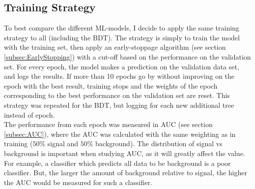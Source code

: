 \subsection{Training Strategy}\label{subsec:TrainingStrategy}
To best compare the different \ac{ML}-models, I decide to apply the same training strategy to all (including the \ac{BDT}). The strategy is simply to train the model 
with the training set, then apply an early-stoppage algorithm (see section \ref{subsec:EarlyStopping}) with a cut-off based on the performance on the validation set. For 
every epoch, the model makes a prediction on the validation data set, and logs the results. If more than 10 epochs go by without improving on the epoch with the best result,
training stops and the weights of the epoch corresponding to the best performance on the validation set are reset. This strategy was repeated for the \ac{BDT}, but logging 
for each new additional tree instead of epoch.
\\
The performance from each epoch was measured in \ac{AUC} (see section \ref{subsec:AUC}), where the \ac{AUC} was calculated with the same weighting as in training ($50\%$ signal
and $50\%$ background). The distribution of signal vs background is important when studying AUC, as it will greatly affect the value. For example, a classifier which predicts all 
data to be background is a poor classifier. But, the larger the amount of background relative to signal, the higher the \ac{AUC} would be measured for such a classifier. 